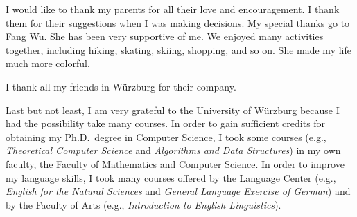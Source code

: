 {I would like to thank my parents
for all their love and encouragement.
I thank them for their suggestions 
when I was making decisions.
My special thanks go to Fang Wu.
She has been very supportive of me.
We enjoyed many activities together, 
including hiking, skating, skiing, shopping, and so on.
She made my life much more colorful.

I thank all my friends in W\"urzburg
for their company.

Last but not least, 
I am very grateful to the University of W\"urzburg 
because I had the possibility take many courses.
In order to gain sufficient credits for 
obtaining my Ph.D.\ degree in Computer Science,
I took some courses
(e.g., \emph{Theoretical Computer Science}
and \emph{Algorithms and Data Structures})
in my own faculty, 
the Faculty of Mathematics and Computer Science.
%
In order to improve my language skills,
I took many courses
offered by the Language Center
(e.g., \emph{English for the Natural Sciences} 
and \emph{General Language Exercise of German})
and by the Faculty of Arts 
(e.g., \emph{Introduction to English Linguistics}).

}